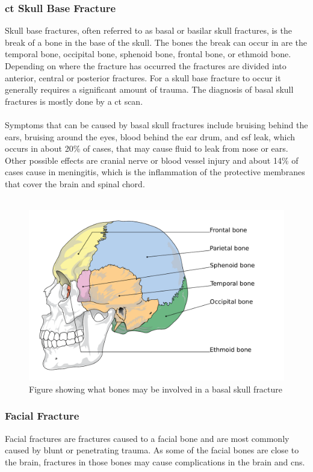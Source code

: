 \documentclass[11pt]{article}
\begin{document}
\subsubsection{\gls{ct} Skull Base Fracture}
Skull base fractures, often referred to as basal or basilar skull fractures, is the break of a bone in the base of the skull. The bones the break can occur in are the temporal bone, occipital bone, sphenoid bone, frontal bone, or ethmoid bone. Depending on where the fracture has occurred the fractures are divided into anterior, central or posterior fractures. For a skull base fracture to occur it generally requires a significant amount of trauma. The diagnosis of basal skull fractures is mostly done by a \gls{ct} scan.\cite{BasilarSkullFracture2021}\\
\\
Symptoms that can be caused by basal skull fractures include bruising behind the ears, bruising around the eyes, blood behind the ear drum, and \gls{csf} leak, which occurs in about 20\% of cases, that may cause fluid to leak from nose or ears. Other possible effects are cranial nerve or blood vessel injury and about 14\% of cases cause in meningitis, which is the inflammation of the protective membranes that cover the brain and spinal chord.\cite{BasilarSkullFracture2021}\\
\\
\begin{figure}[ht]
  \centering
  \includegraphics[width=12cm]{graphics/cranial_bones.pdf}
  \caption{Figure showing what bones may be involved in a basal skull fracture\cite{BasilarSkullFracture2021}}
\end{figure}

\subsubsection{Facial Fracture}
Facial fractures are fractures caused to a facial bone and are most commonly caused by blunt or penetrating trauma\cite{ibrahimFacialFracturesRadiology}. As some of the facial bones are close to the brain, fractures in those bones may cause complications in the brain and \gls{cns}.\cite{FacialFracturesTypes}
\end{document}
